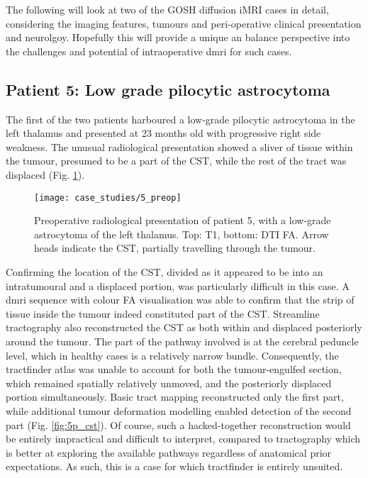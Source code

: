 The following will look at two of the GOSH diffusion iMRI cases in detail, considering the imaging features, tumours and peri-operative clinical presentation and neurolgoy.
Hopefully this will provide a unique an balance perspective into the challenges and potential of intraoperative \gls{dmri} for such cases.

\subsection{Patient 5: Low grade pilocytic astrocytoma}


The first of the two patients harboured a low-grade pilocytic astrocytoma in the left thalamus and presented at 23 months old with progressive right side weakness.
The unusual radiological presentation showed a sliver of tissue within the tumour, presumed to be a part of the CST, while the rest of the tract was displaced (Fig. \ref{fig:5p}).

\begin{figure}
  \centering
  \texttt{[image: case\_studies/5\_preop]}
  \caption{Preoperative radiological presentation of patient 5, with a low-grade astrocytoma of the left thalamus. Top: T1, bottom: DTI FA. Arrow heads indicate the CST, partially travelling through the tumour.}
  \label{fig:5p}
\end{figure}

Confirming the location of the CST, divided as it appeared to be into an intratumoural and a displaced portion, was particularly difficult in this case.
A \gls{dmri} sequence with colour FA visualisation was able to confirm that the strip of tissue inside the tumour indeed constituted part of the CST.
Streamline tractography also reconstructed the CST as both within and displaced posteriorly around the tumour.
The part of the pathway involved is at the cerebral peduncle level, which in healthy cases is a relatively narrow bundle.
Consequently, the tractfinder atlas was unable to account for both the tumour-engulfed section, which remained spatially relatively unmoved, and the posteriorly displaced portion simultaneously.
Basic tract mapping reconstructed only the first part, while additional tumour deformation modelling enabled detection of the second part (Fig. \ref{fig:5p_cst}).
Of course, such a hacked-together reconstruction would be entirely impractical and difficult to interpret, compared to tractography which is better at exploring the available pathways regardless of anatomical prior expectations.
As such, this is a case for which tractfinder is entirely unsuited.

